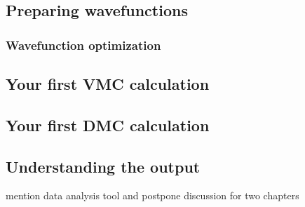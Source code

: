 \subsection{Preparing wavefunctions}
\subsubsection{Wavefunction optimization}
\subsection{Your first VMC calculation}
\subsection{Your first DMC calculation}
\subsection{Understanding the output}
mention data analysis tool and postpone discussion for two chapters

